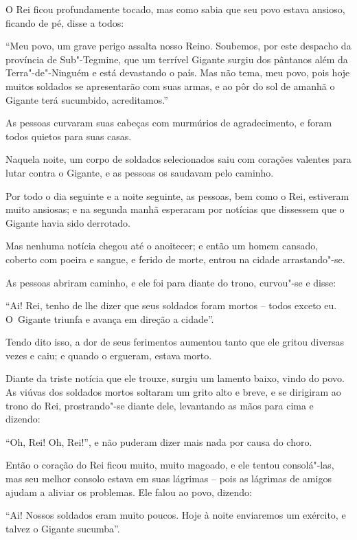 O Rei ficou profundamente tocado, mas como sabia que seu povo estava
ansioso, ficando de pé, disse a todos:

``Meu povo, um grave perigo assalta nosso Reino. Soubemos, por este
despacho da província de Sub"-Tegmine, que um terrível Gigante surgiu dos
pântanos além da Terra"-de"-Ninguém e está devastando o país. Mas não
tema, meu povo, pois hoje muitos soldados se apresentarão com suas
armas, e ao pôr do sol de amanhã o Gigante terá sucumbido,
acreditamos.''

As pessoas curvaram suas cabeças com murmúrios de agradecimento, e foram
todos quietos para suas casas.

Naquela noite, um corpo de soldados selecionados saiu com corações
valentes para lutar contra o Gigante, e as pessoas os saudavam pelo
caminho.

\smallskip

Por todo o dia seguinte e a noite seguinte, as pessoas, bem como o Rei,
estiveram muito ansiosas; e na segunda manhã esperaram por notícias que
dissessem que o Gigante havia sido derrotado.

Mas nenhuma notícia chegou até o anoitecer; e então um homem cansado,
coberto com poeira e sangue, e ferido de morte, entrou na cidade
arrastando"-se.

As pessoas abriram caminho, e ele foi para diante do trono, curvou"-se e
disse:

``Ai! Rei, tenho de lhe dizer que seus soldados foram mortos -- todos
exceto eu. O~Gigante triunfa e avança em direção a cidade''.

Tendo dito isso, a dor de seus ferimentos aumentou tanto que ele gritou
diversas vezes e caiu; e quando o ergueram, estava morto.

Diante da triste notícia que ele trouxe, surgiu um lamento baixo, vindo
do povo. As viúvas dos soldados mortos soltaram um grito alto e breve, e
se dirigiram ao trono do Rei, prostrando"-se diante dele, levantando as
mãos para cima e dizendo:

``Oh, Rei! Oh, Rei!'', e não puderam dizer mais nada por causa do choro.

Então o coração do Rei ficou muito, muito magoado, e ele tentou
consolá"-las, mas seu melhor consolo estava em suas lágrimas -- pois as
lágrimas de amigos ajudam a aliviar os problemas. Ele falou ao povo,
dizendo:

``Ai! Nossos soldados eram muito poucos. Hoje à noite enviaremos um
exército, e talvez o Gigante sucumba''.

